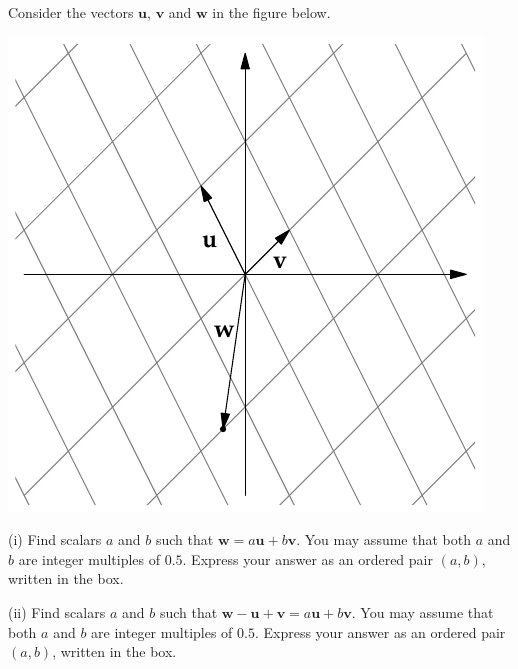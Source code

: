 \documentclass{watsonbook}
\begin{document}
\begin{aexercise}
Consider the vectors $\mathbf{u}$, $\mathbf{v}$ and $\mathbf{w}$ in the figure below. 

\begin{center}
  \includegraphics{exercisefigures/parallelogram}
\end{center}

(i) Find scalars $a$ and $b$ such that $\mathbf{w} = a\mathbf{u} + b\mathbf{v}$. You may assume that both $a$ and $b$ are integer multiples of $0.5$. Express your answer as an ordered pair $(a,b)$, written in the box. 

(ii) Find scalars $a$ and $b$ such that $\mathbf{w} - \mathbf{u} + \mathbf{v} = a\mathbf{u} + b\mathbf{v}$. You may assume that both $a$ and $b$ are integer multiples of $0.5$. Express your answer as an ordered pair $(a,b)$, written in the box. 
\end{aexercise}
\end{document}
